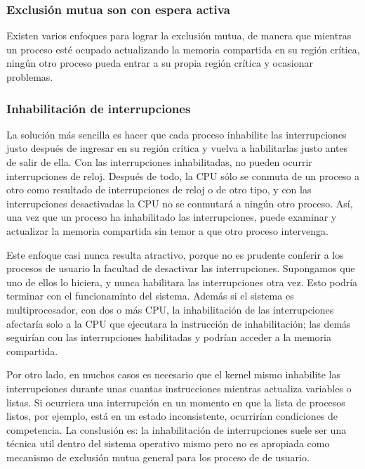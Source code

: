 \documentclass{article}
\begin{document}
\subsubsection{Exclusi\'on mutua son con espera activa}
Existen varios enfoques para lograr la exclusi\'on mutua, de manera 
que mientras un proceso est\'e ocupado actualizando la memoria 
compartida en su regi\'on cr\'itica, ning\'un otro proceso pueda 
entrar a su propia regi\'on cr\'itica y ocasionar problemas.

\subsubsection*{Inhabilitaci\'on de interrupciones}
La soluci\'on m\'as sencilla es hacer que cada proceso inhabilite las 
interrupciones justo despu\'es de ingresar en su regi\'on cr\'itica 
y vuelva a habilitarlas justo antes de salir de ella. Con las 
interrupciones inhabilitadas, no pueden ocurrir in\-te\-rrup\-cio\-nes 
de reloj.  Despu\'es de todo, la CPU s\'olo se conmuta de un proceso a 
otro como resultado de interrupciones de reloj o de otro tipo, y con las 
in\-te\-rrup\-cio\-nes desactivadas la CPU no se conmutar\'a a ning\'un otro 
proceso. As\'i, una vez que un proceso ha inhabilitado las 
interrupciones, puede examinar y actualizar la memoria compartida sin 
temor a que otro proceso intervenga.

Este enfoque casi nunca resulta atractivo, porque no es prudente 
conferir a los procesos de usuario la facultad de desactivar las 
interrupciones. Supongamos que uno de ellos lo hiciera, y nunca 
habilitara las interrupciones otra vez. Esto podr\'ia terminar con 
el funcionaminto del sistema. Adem\'as si el sistema es multiprocesador, 
con dos o m\'as CPU, la inhabilitaci\'on de las interrupciones 
afectar\'ia solo a la CPU que ejecutara la instrucci\'on de 
inhabilitaci\'on; las dem\'as seguir\'ian con las interrupciones 
habilitadas y podr\'ian acceder a la memoria compartida.

Por otro lado, en muchos casos es necesario que el kernel mismo 
inhabilite las interrupciones durante unas cuantas instrucciones 
mientras actualiza variables o listas. Si ocurriera una interrupci\'on 
en un momento en que la lista de procesos listos, por ejemplo, est\'a 
en un estado inconsistente, ocurrir\'ian condiciones de competencia. 
La conslusi\'on es: la inhabilitaci\'on de interrupciones suele ser 
una t\'ecnica util dentro del sistema operativo mismo pero no es 
apropiada como mecanismo de exclusi\'on mutua general para los 
proceso de  de usuario.
\end{document}
